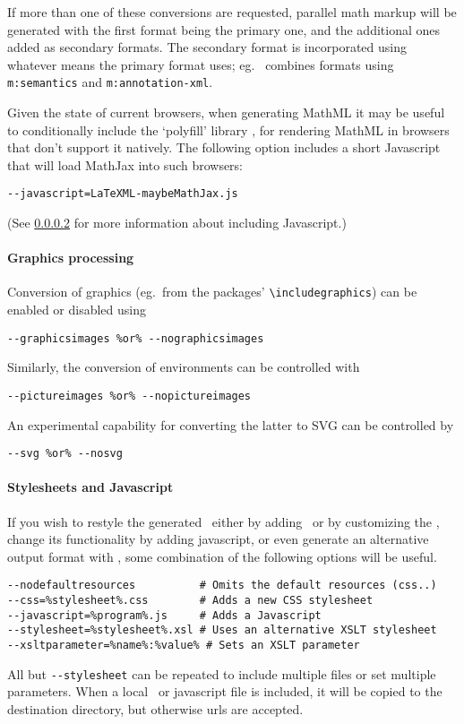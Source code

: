 \documentclass{book}
\newcommand{\shellcode}{\lstinline[style=shell]}
\begin{document}
If more than one of these conversions are requested,
parallel math markup will be generated with the first format
being the primary one, and the additional ones added as secondary formats.
The secondary format is incorporated using whatever means
the primary format uses; eg. \MathML\ combines formats using
\texttt{m:semantics} and \texttt{m:annotation-xml}.

Given the state of current browsers, when generating MathML it may be
useful to conditionally include the `polyfill' library ,
for rendering MathML in browsers that don't support it natively.
The following option includes a short Javascript that will load MathJax into such browsers:
\begin{lstlisting}[style=shell]
--javascript=LaTeXML-maybeMathJax.js
\end{lstlisting}
(See \ref{usage.post.xslt} for more information about including Javascript.)

\paragraph[Graphics]{Graphics processing}\label{usage.post.graphics}
Conversion of graphics (eg.~from the  packages' 
\verb|\includegraphics|) can be enabled or disabled
using
\begin{lstlisting}[style=shell]
--graphicsimages %or% --nographicsimages
\end{lstlisting}
Similarly, the conversion of  environments can be controlled with
\begin{lstlisting}[style=shell]
--pictureimages %or% --nopictureimages
\end{lstlisting}
An experimental capability for converting the latter to \textsc{SVG} can be
controlled by
\begin{lstlisting}[style=shell]
--svg %or% --nosvg
\end{lstlisting}

\paragraph{Stylesheets and Javascript}\label{usage.post.xslt}
If you wish to restyle the generated \HTML\ either by adding \CSS\ or by customizing
the \XSLT, change its functionality by adding javascript,
or even generate an alternative output format with \XSLT,
some combination of the following options will be useful.
\begin{lstlisting}[style=shell]
--nodefaultresources          # Omits the default resources (css..)
--css=%stylesheet%.css        # Adds a new CSS stylesheet
--javascript=%program%.js     # Adds a Javascript
--stylesheet=%stylesheet%.xsl # Uses an alternative XSLT stylesheet
--xsltparameter=%name%:%value% # Sets an XSLT parameter
\end{lstlisting}
All but \shellcode{--stylesheet} can be repeated to include multiple files
or set multiple parameters.  When a local \CSS\ or javascript file is included,
it will be copied to the destination directory, but otherwise urls are accepted.
\end{document}
